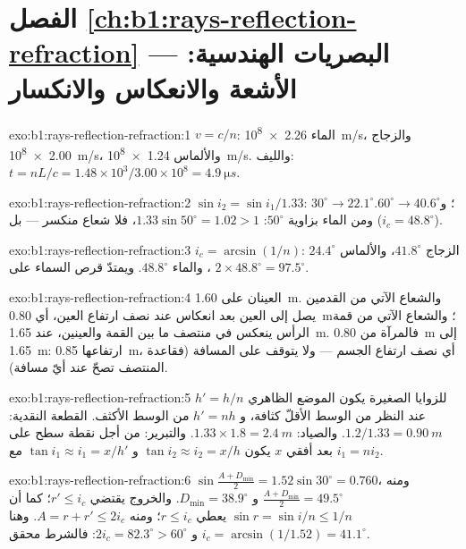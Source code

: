 \section*{الفصل \ref{ch:b1:rays-reflection-refraction} --- البصريات الهندسية: الأشعة والانعكاس والانكسار}

\begin{solution}{exo:b1:rays-reflection-refraction:1}
$v = c/n$: الماء \qty{2.26e8}{m/s}، والزجاج \qty{2.00e8}{m/s}، والألماس
\qty{1.24e8}{m/s}. والليف: $t = nL/c = 1.48 \times 10^3/3.00\times10^8 =
\qty{4.9}{\micro s}$.
\end{solution}

\begin{solution}{exo:b1:rays-reflection-refraction:2}
$\sin i_2 = \sin i_1/1.33$: $30^\circ \to 22.1^\circ$؛ و$60^\circ \to
40.6^\circ$. ومن الماء بزاوية $50^\circ$: $1.33\sin 50^\circ = 1.02 > 1$،
فلا شعاع منكسر --- بل  ($i_c = 48.8^\circ$).
\end{solution}

\begin{solution}{exo:b1:rays-reflection-refraction:3}
$i_c = \arcsin(1/n)$: الزجاج $41.8^\circ$، والألماس $24.4^\circ$، والماء
$48.8^\circ$. ويمتدّ قرص السماء على $2 \times 48.8^\circ = 97.5^\circ$.
\end{solution}

\begin{solution}{exo:b1:rays-reflection-refraction:4}
العينان على \qty{1.60}{m}. والشعاع الآتي من القدمين يصل إلى العين بعد
انعكاس عند نصف ارتفاع العين، أي \qty{0.80}{m}؛ والشعاع الآتي من قمة
الرأس ينعكس في منتصف ما بين القمة والعينين، عند \qty{1.65}{m}.
فالمرآة من \qty{0.80}{m} إلى \qty{1.65}{m}: ارتفاعها \qty{0.85}{m}، أي نصف
ارتفاع الجسم --- ولا يتوقف على المسافة (فقاعدة المنتصف
تصحّ عند أيّ مسافة).
\end{solution}

\begin{solution}{exo:b1:rays-reflection-refraction:5}
للزوايا الصغيرة يكون الموضع الظاهري $h' = h/n$ عند النظر من
الوسط الأقلّ كثافة، و $h' = nh$ من الوسط الأكثف. القطعة النقدية: $1.2/1.33 =
\qty{0.90}{m}$. والصياد: $1.33 \times 1.8 = \qty{2.4}{m}$. والتبرير:
من أجل نقطة سطح على بعد أفقي $x$ يكون $\tan i_2 \approx i_2 =
x/h$ و $\tan i_1 \approx i_1 = x/h'$ مع $i_1 = n i_2$.
\end{solution}

\begin{solution}{exo:b1:rays-reflection-refraction:6}
$\sin\frac{A + D_{\min}}{2} = 1.52\sin 30^\circ = 0.760$، ومنه
$\frac{A + D_{\min}}{2} = 49.5^\circ$ و $D_{\min} = 38.9^\circ$.
والخروج يقتضي $r' \leq i_c$؛ كما أن $\sin r = \sin i/n \leq 1/n$ يعطي
$r \leq i_c$؛ ومنه $A = r + r' \leq 2i_c$. وهنا $i_c = \arcsin(1/1.52) =
41.1^\circ$ و $2i_c = 82.3^\circ > 60^\circ$: فالشرط محقق.
\end{solution}

